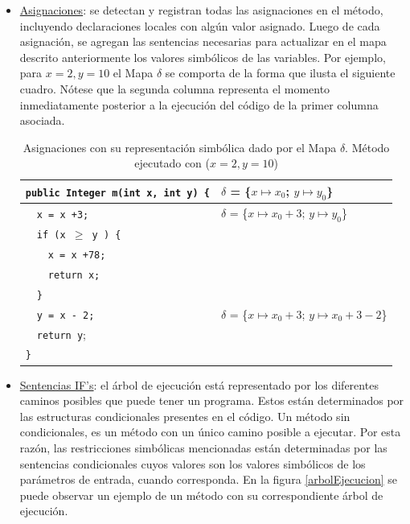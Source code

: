 \documentclass{llncs}
\begin{document}
\begin{itemize}
  \item \underline{Asignaciones}: se detectan y registran todas las asignaciones en el método, incluyendo declaraciones locales con algún valor asignado. Luego
  de cada asignación, se agregan las sentencias necesarias para actualizar en el mapa descrito anteriormente los valores simbólicos de las variables.
  Por ejemplo, para $x=2, y=10$ el Mapa $\delta$ se comporta de la forma que ilusta el siguiente cuadro. Nótese que la segunda columna representa el momento
  inmediatamente posterior a la ejecución del código de la primer columna asociada.
      \begin{table}
	\centering
	\begin{tabular}{|m{5.5cm} | m{5cm}|}
	  \hline
	  \texttt{public Integer m(int x, int y) \{}  & $\delta$ = \{$x \mapsto x_0$; $y \mapsto y_0$\}\\
	  \hline
	  \ \ \texttt{x = x +3;} 		      & $\delta$ = \{$x \mapsto x_0 + 3$; $y \mapsto y_0$\}\\
	  \hline
	  \ \ \texttt{if (x $\geq$ y ) \{}	      &  \\
	  \hline
	  \ \ \ \ \texttt{x = x +78;} 		      & \\
	  \hline
	  \ \ \ \ \texttt{return x;} 		      & \\
	  \hline
	  \ \ \texttt{\}} 			      & \\
	  \hline
	  \ \ \texttt{y = x - 2;} 		      & $\delta$ = \{$x \mapsto x_0 + 3$; $y \mapsto x_0 +3 - 2$\}\\
	  \hline
	  \ \ \texttt{return y}; 		      & \\
	  \hline
	  \texttt{\}} 				      & \\
	  \hline
	\end{tabular}
	\centering
	\caption{Asignaciones con su representación simbólica dado por el Mapa $\delta$. Método ejecutado con ($x=2, y=10$)}
      \end{table}
      
  \item \underline{Sentencias IF’s}: el árbol de ejecución está representado por los diferentes caminos posibles que puede tener un programa. Estos están determinados por las
  estructuras condicionales presentes en el código. Un método sin condicionales, es un método con un único camino posible a ejecutar. Por esta razón, las restricciones simbólicas
  mencionadas están determinadas por las sentencias condicionales cuyos valores son los valores simbólicos de los parámetros de entrada, cuando corresponda. En la figura
  \ref{arbolEjecucion} se puede observar un ejemplo de un método con su correspondiente árbol de ejecución.
  

\end{itemize}
\end{document}
